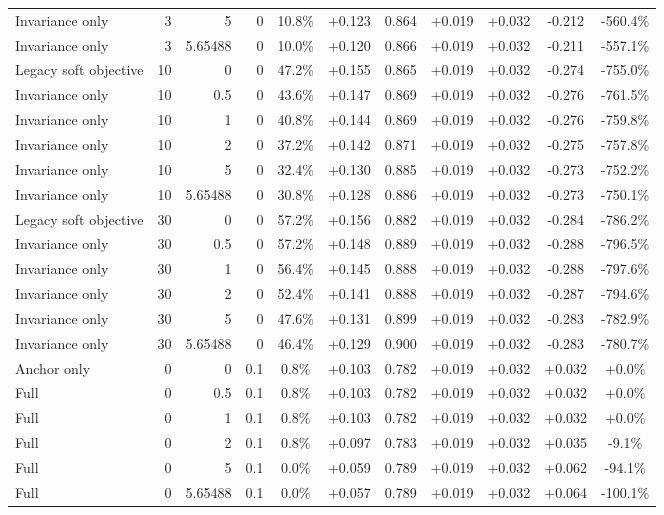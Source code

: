 \begin{table}[htbp]
\begin{tabular}{lrrrccccccc}
Invariance only & 3 & 5 & 0 & 10.8\% & +0.123 & 0.864 & +0.019 & +0.032 & -0.212 & -560.4\% \\
Invariance only & 3 & 5.65488 & 0 & 10.0\% & +0.120 & 0.866 & +0.019 & +0.032 & -0.211 & -557.1\% \\
Legacy soft objective & 10 & 0 & 0 & 47.2\% & +0.155 & 0.865 & +0.019 & +0.032 & -0.274 & -755.0\% \\
Invariance only & 10 & 0.5 & 0 & 43.6\% & +0.147 & 0.869 & +0.019 & +0.032 & -0.276 & -761.5\% \\
Invariance only & 10 & 1 & 0 & 40.8\% & +0.144 & 0.869 & +0.019 & +0.032 & -0.276 & -759.8\% \\
Invariance only & 10 & 2 & 0 & 37.2\% & +0.142 & 0.871 & +0.019 & +0.032 & -0.275 & -757.8\% \\
Invariance only & 10 & 5 & 0 & 32.4\% & +0.130 & 0.885 & +0.019 & +0.032 & -0.273 & -752.2\% \\
Invariance only & 10 & 5.65488 & 0 & 30.8\% & +0.128 & 0.886 & +0.019 & +0.032 & -0.273 & -750.1\% \\
Legacy soft objective & 30 & 0 & 0 & 57.2\% & +0.156 & 0.882 & +0.019 & +0.032 & -0.284 & -786.2\% \\
Invariance only & 30 & 0.5 & 0 & 57.2\% & +0.148 & 0.889 & +0.019 & +0.032 & -0.288 & -796.5\% \\
Invariance only & 30 & 1 & 0 & 56.4\% & +0.145 & 0.888 & +0.019 & +0.032 & -0.288 & -797.6\% \\
Invariance only & 30 & 2 & 0 & 52.4\% & +0.141 & 0.888 & +0.019 & +0.032 & -0.287 & -794.6\% \\
Invariance only & 30 & 5 & 0 & 47.6\% & +0.131 & 0.899 & +0.019 & +0.032 & -0.283 & -782.9\% \\
Invariance only & 30 & 5.65488 & 0 & 46.4\% & +0.129 & 0.900 & +0.019 & +0.032 & -0.283 & -780.7\% \\
Anchor only & 0 & 0 & 0.1 & 0.8\% & +0.103 & 0.782 & +0.019 & +0.032 & +0.032 & +0.0\% \\
Full & 0 & 0.5 & 0.1 & 0.8\% & +0.103 & 0.782 & +0.019 & +0.032 & +0.032 & +0.0\% \\
Full & 0 & 1 & 0.1 & 0.8\% & +0.103 & 0.782 & +0.019 & +0.032 & +0.032 & +0.0\% \\
Full & 0 & 2 & 0.1 & 0.8\% & +0.097 & 0.783 & +0.019 & +0.032 & +0.035 & -9.1\% \\
Full & 0 & 5 & 0.1 & 0.0\% & +0.059 & 0.789 & +0.019 & +0.032 & +0.062 & -94.1\% \\
Full & 0 & 5.65488 & 0.1 & 0.0\% & +0.057 & 0.789 & +0.019 & +0.032 & +0.064 & -100.1\% \\

\end{tabular}
\end{table}
